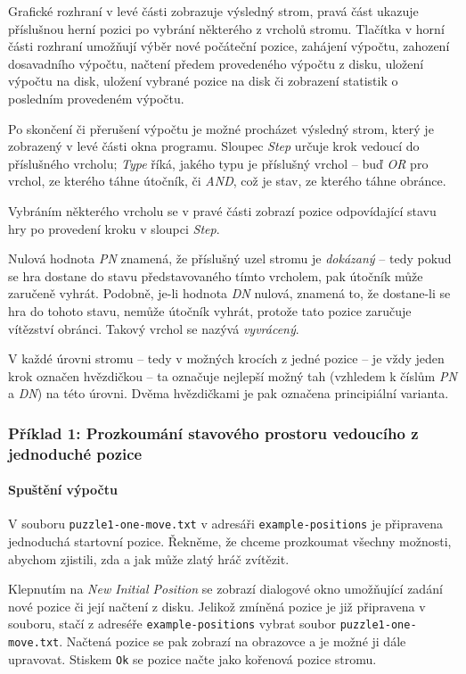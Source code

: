 \documentclass{article}
\begin{document}
Grafické rozhraní v levé části zobrazuje výsledný strom, pravá část ukazuje
příslušnou herní pozici po vybrání některého z vrcholů stromu. Tlačítka v horní 
části rozhraní umožňují výběr nové počáteční pozice, zahájení výpočtu, zahození
dosavadního výpočtu, načtení předem provedeného výpočtu z disku, uložení výpočtu 
na disk, uložení vybrané pozice na disk či zobrazení statistik o posledním 
provedeném výpočtu.

Po skončení či přerušení výpočtu je možné procházet výsledný strom, který je 
zobrazený v levé části okna programu. Sloupec \emph{Step} určuje krok vedoucí do 
příslušného vrcholu; \emph{Type} říká, jakého typu je příslušný vrchol -- buď
\emph{OR} pro vrchol, ze kterého táhne útočník, či \emph{AND}, což je stav, ze
kterého táhne obránce.

Vybráním některého vrcholu se v pravé části zobrazí pozice odpovídající stavu
hry po provedení kroku v sloupci \emph{Step}.

Nulová hodnota \emph{PN} znamená, že příslušný uzel stromu je \emph{dokázaný} --
tedy pokud se hra dostane do stavu představovaného tímto vrcholem, pak útočník 
může zaručeně vyhrát. Podobně, je-li hodnota \emph{DN} nulová, znamená to, že 
dostane-li se hra do tohoto stavu, nemůže útočník vyhrát, protože tato pozice 
zaručuje vítězství obránci. Takový vrchol se nazývá \emph{vyvrácený}.

V každé úrovni stromu -- tedy v možných krocích z jedné pozice -- je vždy jeden
krok označen hvězdičkou -- ta označuje nejlepší možný tah (vzhledem k číslům 
\emph{PN} a \emph{DN}) na této úrovni. Dvěma hvězdičkami je pak označena 
principiální varianta.

\subsubsection{Příklad 1: Prozkoumání stavového prostoru vedoucího z jednoduché
pozice}
\paragraph{Spuštění výpočtu}
V souboru \texttt{puzzle1-one-move.txt} v adresáři \texttt{example-positions} je
připravena jednoduchá startovní pozice.
Řekněme, že chceme prozkoumat všechny možnosti, abychom zjistili, zda a jak může
zlatý hráč zvítězit.

Klepnutím na \emph{New Initial Position} se zobrazí dialogové okno umožňující
zadání nové pozice či její načtení z disku. Jelikož zmíněná pozice je již 
připravena v souboru, stačí z adreséře \texttt{example-positions} vybrat soubor
\texttt{puzzle1-{}one-{}move.txt}. Načtená pozice se pak zobrazí na obrazovce a
je možné ji dále upravovat. Stiskem \texttt{Ok} se pozice načte jako kořenová 
pozice stromu.
\end{document}
